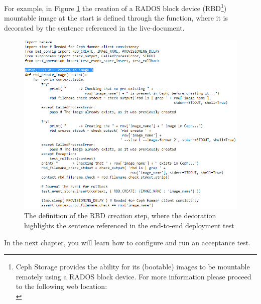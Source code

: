 For example, in Figure \ref{fig:chp1_bdd-bmi-function-definition} the creation of a RADOS block device (RBD\footnote{Ceph Storage provides the ability for its (bootable) images to be mountable remotely using a RADOS block device.  For more information please proceed to the following web location: \\  }) mountable image at the start is defined through the  function, where it is decorated by the sentence referenced in the live-document. \\

\text{}\vspace{10mm}

\pagebreak

%
\begin{figure}[!h] %
\begin{center}
\includegraphics[scale=1]{figures/bmi-bdd-step-definition-v3.png}
\end{center}
\caption{The definition of the RBD creation step, where the decoration highlights the sentence referenced in the end-to-end deployment test}
\label{fig:chp1_bdd-bmi-function-definition}
\end{figure}

\text{}\vspace{10mm}

In the next chapter, you will learn how to configure and run an acceptance test.